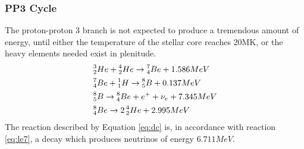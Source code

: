 \documentclass[10pt, nofootinbib, twocolumn]{revtex4-1}
\begin{document}
\subsubsection{PP3 Cycle}
The proton-proton 3 branch is not expected to produce a tremendous amount of energy, until either the temperature of the stellar core reaches 20MK, or the heavy elements needed exist in plenitude.
\begin{align}
    & \prescript{3}{2}He+\prescript{4}{2}He\rightarrow\prescript{7}{4}Be+1.586MeV \label{eq:repeat}\\
    & \prescript{7}{4}Be+\prescript{1}{1}H \rightarrow \prescript{8}{5}B+0.137MeV \label{eq:l17}\\
    & \prescript{8}{5}B  \rightarrow \prescript{8}{4}Be+e^++\nu_e+7.345MeV \label{eq:dc}\\
    & \prescript{8}{4}Be \rightarrow 2\prescript{4}{2}He +2.995MeV\label{eq:grr}
\end{align}
The reaction described by Equation \eqref{eq:dc} is, in accordance with reaction \eqref{eq:le7}, a decay which produces neutrinos of energy $6.711MeV$.
\end{document}
